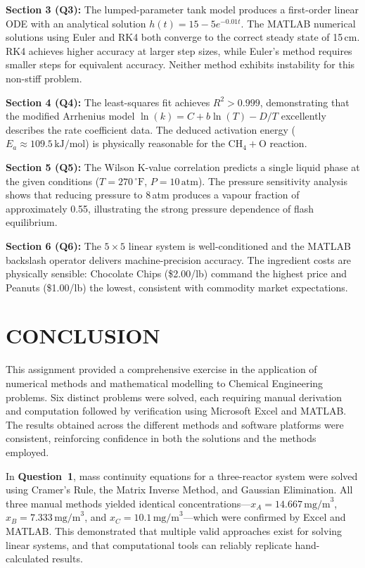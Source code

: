 \documentclass[12pt,a4paper]{article}
\begin{document}
\textbf{Section 3 (Q3):} The lumped-parameter tank model produces a first-order linear ODE
with an analytical solution $h(t) = 15 - 5e^{-0.01t}$. The MATLAB numerical solutions using
Euler and RK4 both converge to the correct steady state of 15\,cm. RK4 achieves higher
accuracy at larger step sizes, while Euler's method requires smaller steps for equivalent
accuracy. Neither method exhibits instability for this non-stiff problem.

\textbf{Section 4 (Q4):} The least-squares fit achieves $R^2 > 0.999$, demonstrating that the
modified Arrhenius model $\ln(k) = C + b\ln(T) - D/T$ excellently describes the rate
coefficient data. The deduced activation energy ($E_a \approx 109.5\,\text{kJ/mol}$) is
physically reasonable for the $\text{CH}_4 + \text{O}$ reaction.

\textbf{Section 5 (Q5):} The Wilson K-value correlation predicts a single liquid phase at the
given conditions ($T = 270\,^\circ\text{F}$, $P = 10\,\text{atm}$). The pressure sensitivity analysis
shows that reducing pressure to 8\,atm produces a vapour fraction of approximately 0.55,
illustrating the strong pressure dependence of flash equilibrium.

\textbf{Section 6 (Q6):} The $5\times5$ linear system is well-conditioned and the MATLAB backslash
operator delivers machine-precision accuracy. The ingredient costs are physically sensible:
Chocolate Chips (\$2.00/lb) command the highest price and Peanuts (\$1.00/lb) the lowest,
consistent with commodity market expectations.

\section*{CONCLUSION}

This assignment provided a comprehensive exercise in the application of numerical methods
and mathematical modelling to Chemical Engineering problems. Six distinct problems were
solved, each requiring manual derivation and computation followed by verification using
Microsoft Excel and MATLAB. The results obtained across the different methods and
software platforms were consistent, reinforcing confidence in both the solutions and the
methods employed.

In \textbf{Question~1}, mass continuity equations for a three-reactor system were solved using
Cramer's Rule, the Matrix Inverse Method, and Gaussian Elimination. All three manual
methods yielded identical concentrations---$x_A = 14.667\,\text{mg/m}^3$,
$x_B = 7.333\,\text{mg/m}^3$, and $x_C = 10.1\,\text{mg/m}^3$---which were confirmed by
Excel and MATLAB. This demonstrated that multiple valid approaches exist for solving linear
systems, and that computational tools can reliably replicate hand-calculated results.
\end{document}

